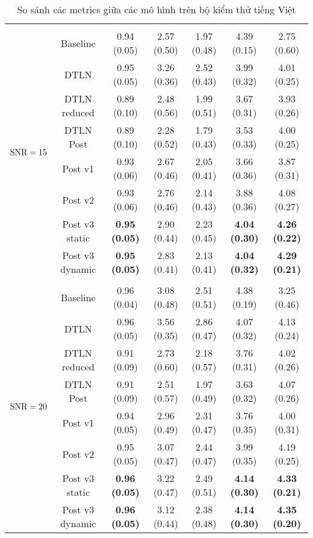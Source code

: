 \begin{table}[h]
\begin{tabular}{l c c c c c c}
				&&&&&&\\
				\multirow{8}{*}{$\text{SNR}=15$}        &Baseline       & 0.94 (0.05)   & 2.57 (0.50)   & 1.97 (0.48)   & 4.39 (0.15)   & 2.75 (0.60) \\
				&DTLN   & 0.95 (0.05)   & 3.26 (0.36)   & 2.52 (0.43)   & 3.99 (0.32)   & 4.01 (0.25) \\
				&DTLN reduced   & 0.89 (0.10)   & 2.48 (0.56)   & 1.99 (0.51)   & 3.67 (0.31)   & 3.93 (0.26) \\
				&DTLN Post      & 0.89 (0.10)   & 2.28 (0.52)   & 1.79 (0.43)   & 3.53 (0.33)   & 4.00 (0.25) \\
				&Post v1        & 0.93 (0.06)   & 2.67 (0.46)   & 2.05 (0.41)   & 3.66 (0.36)   & 3.87 (0.31) \\
				&Post v2        & 0.93 (0.06)   & 2.76 (0.46)   & 2.14 (0.43)   & 3.88 (0.36)   & 4.08 (0.27) \\
				&Post v3 static & \textbf{0.95 (0.05)}   & 2.90 (0.44)   & 2.23 (0.45)   & \textbf{4.04 (0.30)}   & \textbf{4.26 (0.22)} \\
				&Post v3 dynamic        & \textbf{0.95 (0.05)}   & 2.83 (0.41)   & 2.13 (0.41)   & \textbf{4.04 (0.32)}   & \textbf{4.29 (0.21)} \\
				&&&&&&\\
				\multirow{8}{*}{$\text{SNR}=20$}        &Baseline       & 0.96 (0.04)   & 3.08 (0.48)   & 2.51 (0.51)   & 4.38 (0.19)   & 3.25 (0.46) \\
				&DTLN   & 0.96 (0.05)   & 3.56 (0.35)   & 2.86 (0.47)   & 4.07 (0.32)   & 4.13 (0.24) \\
				&DTLN reduced   & 0.91 (0.09)   & 2.73 (0.60)   & 2.18 (0.57)   & 3.76 (0.31)   & 4.02 (0.26) \\
				&DTLN Post      & 0.91 (0.09)   & 2.51 (0.57)   & 1.97 (0.49)   & 3.63 (0.32)   & 4.07 (0.26) \\
				&Post v1        & 0.94 (0.05)   & 2.96 (0.49)   & 2.31 (0.47)   & 3.76 (0.35)   & 4.00 (0.31) \\
				&Post v2        & 0.95 (0.05)   & 3.07 (0.47)   & 2.44 (0.47)   & 3.99 (0.35)   & 4.19 (0.25) \\
				&Post v3 static & \textbf{0.96 (0.05)}   & 3.22 (0.47)   & 2.49 (0.51)   & \textbf{4.14 (0.30)}   & \textbf{4.33 (0.21)} \\
				&Post v3 dynamic        & \textbf{0.96 (0.05)}   & 3.12 (0.44)   & 2.38 (0.48)   & \textbf{4.14 (0.30)}   & \textbf{4.35 (0.20)} \\
				\hline
			\end{tabular}
			\caption{So sánh các metrics giữa các mô hình trên bộ kiểm thử tiếng Việt}
			\label{re::compare_models}
		\end{table}
	
